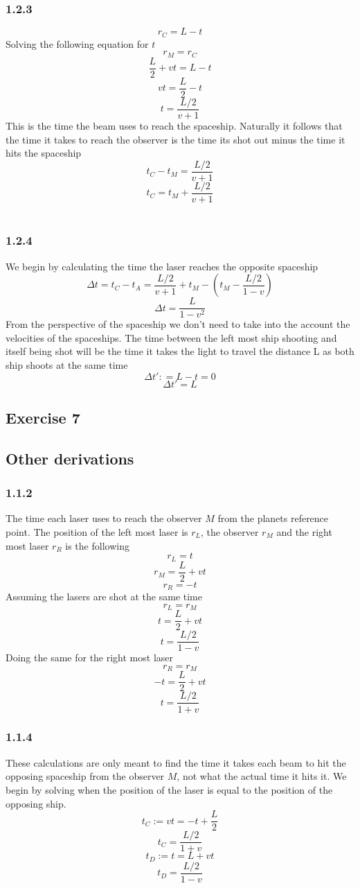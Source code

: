 \documentclass[reprint,english,notitlepage]{revtex4-2}
\begin{document}
\subsubsection*{1.2.3}\label{1.2.3}
\[
r_C = L - t
\]
Solving the following equation for $ t $
\[
r_M = r_C
\]
\[
\frac{L}{2} + vt = L - t
\]
\[
vt = \frac{L}{2} - t
\]
\[
t = \frac{L / 2}{v + 1}
\]
This is the time the beam uses to reach the spaceship. Naturally it follows that the time it takes to reach the observer is the time its shot out minus the time it hits the spaceship
\[
t_C - t_M = \frac{L / 2}{v + 1}
\]  
\[
t_C = t_M + \frac{L / 2}{v + 1}
\]
\\
\subsubsection*{1.2.4}\label{1.2.4}
We begin by calculating the time the laser reaches the opposite spaceship
\[
Δt =  t_C - t_A = \frac{L / 2}{v +1} + t_M - \left( t_M - \frac{L / 2}{1 - v} \right) 
\]
\[
Δt = \frac{L}{1 - v^{2}}
\]
From the perspective of the spaceship we don't need to take into the account the velocities of the spaceships. The time between the left most ship shooting and itself being shot will be the time it takes the light to travel the distance L as both ship shoots at the same time
\[
Δt': = L - t = 0
\]
\[
Δt' = L
\]


\subsection{Exercise 7}



\subsection{Other derivations}
\subsubsection*{1.1.2}\label{o: 1.1.2}
The time each laser uses to reach the observer $ M $ from the planets reference point. The position of the left most laser is $ r_L $, the observer $ r_M $  and the right most laser $ r_R $ is the following
\[
r_L = t
\]
\[
r_M = \frac{L}{2} + vt
\]
\[
r_R = -t
\]
Assuming the lasers are shot at the same time
\[
r_L = r_M
\]
\[
t = \frac{L}{2} + vt
\]
\[
t = \frac{L / 2}{1 - v}
\]
Doing the same for the right most laser
\[
r_R = r_M
\]
\[
-t = \frac{L}{2} + vt
\]
\[
t = \frac{L / 2}{1 + v}
\]
\subsubsection*{1.1.4}\label{o: 1.1.4}
These calculations are only meant to find the time it takes each beam to hit the opposing spaceship from the observer $ M $, not what the actual time it hits it.
We begin by solving when the position of the laser is equal to the position of the opposing ship. 
\[
t_C:= vt = -t + \frac{L}{2}
\]
\[
t_C = \frac{L/ 2}{1 + v}
\]
\[
t_D:= t = L + vt
\]
\[
t_D = \frac{L / 2}{1 - v}
\]
\end{document}
